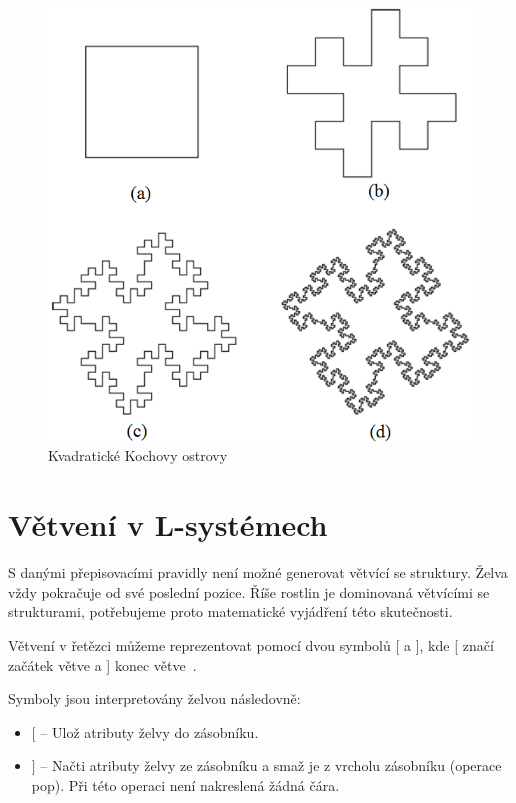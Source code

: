 \documentclass[thesis=M,czech]{FITthesis}[2019/12/23]
\begin{document}
\begin{figure}\centering
	\includegraphics[width=\textwidth]{images/koch_island}
	\caption[Kvadratické Kochovy ostrovy]{Kvadratické Kochovy ostrovy}\label{fig:koch_island}
\end{figure}

\section{Větvení v L-systémech}
S danými přepisovacími pravidly není možné generovat větvící se struktury. Želva vždy pokračuje od své poslední pozice. Říše rostlin je dominovaná větvícími se strukturami, potřebujeme proto matematické vyjádření této skutečnosti.

Větvení v řetězci můžeme reprezentovat pomocí dvou symbolů [ a ], kde [ značí začátek větve a ] konec větve~\cite{abop24}.

Symboly jsou interpretovány želvou následovně:

\begin{itemize}
\item $[$ -- Ulož atributy želvy do zásobníku.
\item $]$ -- Načti atributy želvy ze zásobníku a smaž je z vrcholu zásobníku (operace pop). Při této operaci není nakreslená žádná čára.
\end{itemize}
\end{document}
